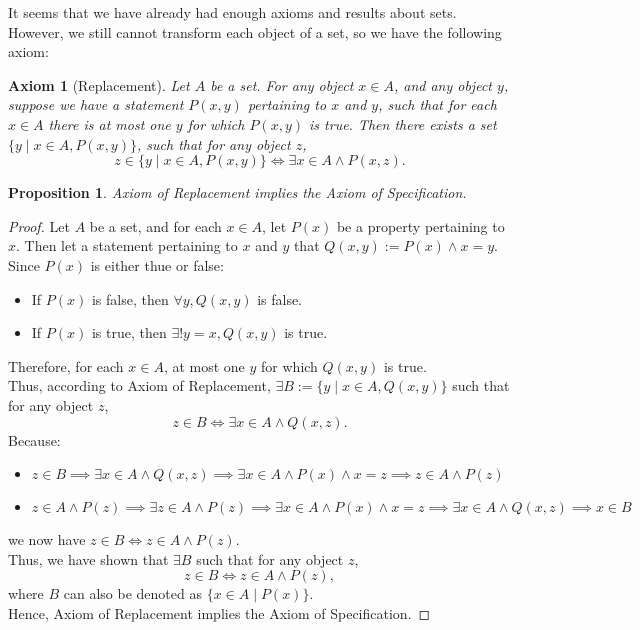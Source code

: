 \documentclass[a4paper]{book}
\newtheorem*{proof}{\textit{Proof.}}
\theoremstyle{break}
\newtheorem{axiom}{Axiom}[chapter]
\newtheorem{proposition}{Proposition}[section]
\begin{document}
			It seems that we have already had enough axioms and results about sets. However, we still cannot transform each object of a set, so we have the following axiom:
			\begin{axiom}[Replacement]
				Let $A$ be a set. For any object $x\in A$, and any object $y$, suppose we have a statement $P(x,y)$ pertaining to $x$ and $y$, such that for each $x\in A$ there is at most one $y$ for which $P(x,y)$ is true. Then there exists a set $\{y\mid x\in A,P(x,y)\}$, such that for any object $z$, $$z\in\{y\mid x\in A,P(x,y)\}\iff \exists x\in A\land P(x,z).$$
			\end{axiom}
			\begin{proposition}
				Axiom of Replacement implies the Axiom of Specification.
			\end{proposition}
			\begin{proof}
				Let $A$ be a set, and for each $x\in A$, let $P(x)$ be a property pertaining to $x$. Then let a statement pertaining to $x$ and $y$ that $Q(x,y):=P(x)\land x=y$.\\
				Since $P(x)$ is either thue or false:
				\begin{itemize}
					\item If $P(x)$ is false, then $\forall y, Q(x,y)$ is false.
					\item If $P(x)$ is true, then $\exists!y=x, Q(x,y)$ is true.
				\end{itemize}
				Therefore, for each $x\in A$, at most one $y$ for which $Q(x,y)$ is true.\\
				Thus, according to Axiom of Replacement, $\exists B:=\{y\mid x\in A,Q(x,y)\}$ such that for any object $z$, $$z\in B\iff \exists x\in A\land Q(x,z).$$
				Because:
				\begin{itemize}
					\item $z\in B\implies\exists x\in A\land Q(x,z)\implies \exists x\in A\land P(x)\land x=z\implies z\in A\land P(z)$
					\item $z\in A\land P(z) \implies \exists z\in A\land P(z)\implies \exists x\in A\land P(x)\land x=z \implies \exists x\in A\land Q(x,z)\implies x\in B$
				\end{itemize}
				we now have $z\in B\iff z\in A\land P(z)$.\\
				Thus, we have shown that $\exists B$ such that for any object $z$, $$z\in B\iff z\in A\land P(z),$$ where $B$ can also be denoted as $\{x\in A\mid P(x)\}$.\\
				Hence, Axiom of Replacement implies the Axiom of Specification.
			\end{proof}
\end{document}
